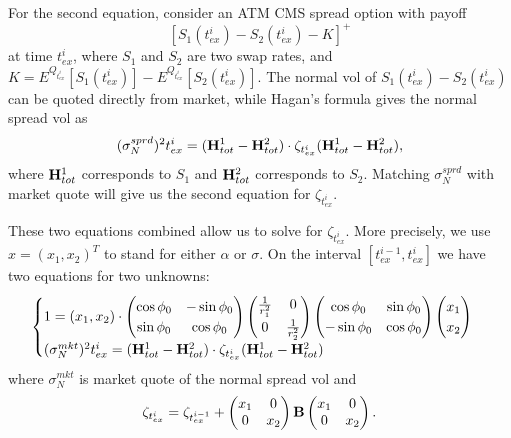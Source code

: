 \documentclass[10pt]{article}
\theoremstyle{plain}
\numberwithin{equation}{section}
\numberwithin{table}{section}
\begin{document}
For the second equation, consider an ATM CMS spread option with payoff
\[
[S_1(t_{ex}^i)-S_2(t_{ex}^i)-K]^+
\]
at time $t^i_{ex}$, where $S_1$ and $S_2$ are two swap rates, and $K =
E^{Q_{t_{ex}^i}}[S_1(t_{ex}^i)] - E^{Q_{t_{ex}^i}}[S_2(t_{ex}^i)]$.
The normal vol of $S_1(t_{ex}^i)-S_2(t_{ex}^i)$ can be quoted directly
from market, while Hagan's formula gives the normal spread vol as
\[
(\sigma_N^{sprd})^2 t_{ex}^i = ({\bf H}_{tot}^1 - {\bf H}_{tot}^2)
\cdot \zeta_{t_{ex}^i} ({\bf H}_{tot}^1 - {\bf H}_{tot}^2),
\]
where ${\bf H}_{tot}^1$ corresponds to $S_1$ and ${\bf H}_{tot}^2$
corresponds to $S_2$. Matching $\sigma_N^{sprd}$ with market quote
will give us the second equation for $\zeta_{t^i_{ex}}$.

\medskip

These two equations combined allow us to solve for $\zeta_{t^i_{ex}}$.
More precisely, we use $x = (x_1, x_2)^T$ to stand for either $\alpha$
or $\sigma$. On the interval $[t_{ex}^{i-1}, t_{ex}^i]$ we have two
equations for two unknowns:
\begin{eqnarray}\label{eqn_alph1_alpha2}
\begin{cases}
1 = (x_1,x_2) \cdot \left(\begin{matrix}\cos\phi_0 & -\sin\phi_0 \\
\sin\phi_0 & \cos\phi_0 \end{matrix} \right)
\left(\begin{matrix}\frac{1}{r_1^2} & 0 \\ 0 & \frac{1}{r_2^2}
\end{matrix} \right)
\left(\begin{matrix}\cos\phi_0 & \sin\phi_0 \\ -\sin\phi_0 &
\cos\phi_0 \end{matrix} \right) \left(\begin{matrix} x_1 \\ x_2
\end{matrix} \right) \\
(\sigma_N^{mkt})^2 t^i_{ex} = ({\bf H}_{tot}^1 - {\bf H}_{tot}^2)
\cdot \zeta_{t_{ex}^i} ({\bf H}_{tot}^1 - {\bf H}_{tot}^2)
\end{cases}
\end{eqnarray}
where $\sigma_N^{mkt}$ is market quote of the normal spread vol and
\begin{eqnarray}\label{formula_alpha2zeta}
\zeta_{t^i_{ex}} = \zeta_{t^{i-1}_{ex}} + \left( \begin{matrix} x_1 &
0 \\ 0 & x_2 \end{matrix}\right)  {\bf B} \left( \begin{matrix} x_1 &
0 \\ 0 & x_2 \end{matrix}\right).
\end{eqnarray}
\end{document}
